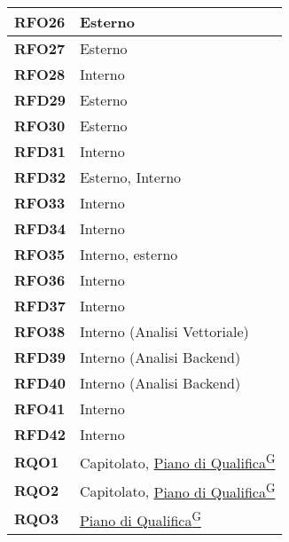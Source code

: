 \begin{longtable}{|>{\centering\arraybackslash}m{}|>{\centering\arraybackslash}m{}|}
	\textbf{RFO26}            & Esterno\\\hline
	\textbf{RFO27}            & Esterno\\\hline
	\textbf{RFO28}            & Interno\\\hline
	\textbf{RFD29}            & Esterno\\\hline
	\textbf{RFO30}            & Esterno\\\hline
	\textbf{RFD31}            & Interno\\\hline
	\textbf{RFD32}            & Esterno, Interno\\\hline
	\textbf{RFO33}            & Interno\\\hline
	\textbf{RFD34}            & Interno\\\hline
	\textbf{RFO35}            & Interno, esterno\\\hline
	\textbf{RFO36}            & Interno\\\hline
	\textbf{RFD37}            & Interno\\\hline	
	\textbf{RFO38}            & Interno (Analisi Vettoriale) \\\hline
	\textbf{RFD39}            & Interno (Analisi Backend) \\\hline
	\textbf{RFD40}            & Interno (Analisi Backend) \\\hline
	\textbf{RFO41}            & Interno \\\hline
	\textbf{RFD42}            & Interno \\\hline
    
	\textbf{RQO1}            & Capitolato, \href{https://code7crusaders.github.io/docs/RTB/documentazione_interna/glossario.html#piano-di-qualifica}{Piano di Qualifica\textsuperscript{G}}\\\hline
	\textbf{RQO2}            & Capitolato, \href{https://code7crusaders.github.io/docs/RTB/documentazione_interna/glossario.html#piano-di-qualifica}{Piano di Qualifica\textsuperscript{G}}\\\hline
	\textbf{RQO3}            & \href{https://code7crusaders.github.io/docs/RTB/documentazione_interna/glossario.html#piano-di-qualifica}{Piano di Qualifica\textsuperscript{G}}\\\hline
    

\end{longtable}

